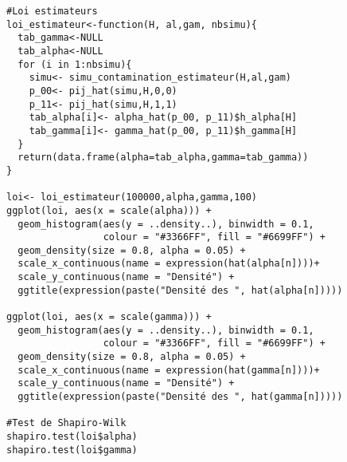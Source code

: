 \documentclass[12pt,a4paper]{report}
\theoremstyle{remark}
\begin{document}
\begin{lstlisting}
#Loi estimateurs
loi_estimateur<-function(H, al,gam, nbsimu){
  tab_gamma<-NULL
  tab_alpha<-NULL
  for (i in 1:nbsimu){
    simu<- simu_contamination_estimateur(H,al,gam)
    p_00<- pij_hat(simu,H,0,0)
    p_11<- pij_hat(simu,H,1,1)
    tab_alpha[i]<- alpha_hat(p_00, p_11)$h_alpha[H]
    tab_gamma[i]<- gamma_hat(p_00, p_11)$h_gamma[H]
  }
  return(data.frame(alpha=tab_alpha,gamma=tab_gamma))
}

loi<- loi_estimateur(100000,alpha,gamma,100)
ggplot(loi, aes(x = scale(alpha))) +
  geom_histogram(aes(y = ..density..), binwidth = 0.1,
                 colour = "#3366FF", fill = "#6699FF") + 
  geom_density(size = 0.8, alpha = 0.05) +
  scale_x_continuous(name = expression(hat(alpha[n])))+
  scale_y_continuous(name = "Densité") +
  ggtitle(expression(paste("Densité des ", hat(alpha[n]))))

ggplot(loi, aes(x = scale(gamma))) +
  geom_histogram(aes(y = ..density..), binwidth = 0.1,
                 colour = "#3366FF", fill = "#6699FF") + 
  geom_density(size = 0.8, alpha = 0.05) +
  scale_x_continuous(name = expression(hat(gamma[n])))+
  scale_y_continuous(name = "Densité") +
  ggtitle(expression(paste("Densité des ", hat(gamma[n]))))

#Test de Shapiro-Wilk
shapiro.test(loi$alpha)
shapiro.test(loi$gamma)
 
\end{lstlisting}
\end{document}
